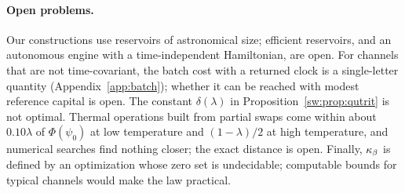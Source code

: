 \paragraph{Open problems.} Our constructions use reservoirs of astronomical size; efficient reservoirs, and an autonomous engine with a time-independent Hamiltonian, are open. For channels that are not time-covariant, the batch cost with a returned clock is a single-letter quantity (Appendix~\ref{app:batch}); whether it can be reached with modest reference capital is open. The constant $\delta(\lambda)$ in Proposition~\ref{sw:prop:qutrit} is not optimal. Thermal operations built from partial swaps come within about $0.10\lambda$ of $\Phi(\psi_0)$ at low temperature and $(1-\lambda)/2$ at high temperature, and numerical searches find nothing closer; the exact distance is open. Finally, $\kappa_\beta$ is defined by an optimization whose zero set is undecidable; computable bounds for typical channels would make the law practical.

